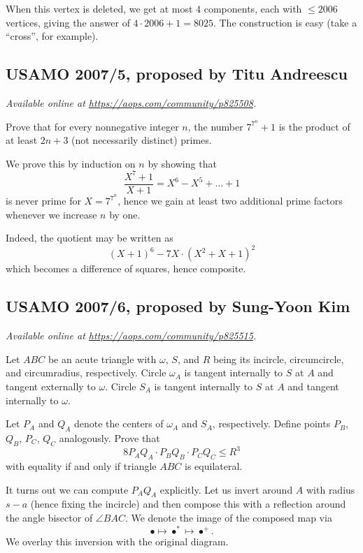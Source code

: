 \documentclass[11pt]{scrartcl}
\begin{document}
When this vertex is deleted,
we get at most $4$ components, each with $\le 2006$ vertices,
giving the answer of $4 \cdot 2006 + 1 = 8025$.
The construction is easy (take a ``cross'', for example).
\pagebreak

\subsection{USAMO 2007/5, proposed by Titu Andreescu}
\textsl{Available online at \url{https://aops.com/community/p825508}.}
\begin{mdframed}[style=mdpurplebox,frametitle={Problem statement}]
Prove that for every nonnegative integer $n$,
the number $7^{7^n}+1$ is the product
of at least $2n+3$ (not necessarily distinct) primes.
\end{mdframed}
We prove this by induction on $n$ by showing that
\[ \frac{X^7+1}{X+1} = X^6 - X^5 + \dots + 1 \]
is never prime for $X = 7^{7^n}$,
hence we gain at least two additional prime factors
whenever we increase $n$ by one.

Indeed, the quotient may be written as
\[ \left( X+1 \right)^6 - 7X \cdot (X^2+X+1)^2 \]
which becomes a difference of squares, hence composite.
\pagebreak

\subsection{USAMO 2007/6, proposed by Sung-Yoon Kim}
\textsl{Available online at \url{https://aops.com/community/p825515}.}
\begin{mdframed}[style=mdpurplebox,frametitle={Problem statement}]
Let $ABC$ be an acute triangle
with $\omega$, $S$, and $R$ being its incircle,
circumcircle, and circumradius, respectively.
Circle $\omega_{A}$ is tangent internally to $S$
at $A$ and tangent externally to $\omega$.
Circle $S_{A}$ is tangent internally to $S$
at $A$ and tangent internally to $\omega$.

Let $P_A$ and $Q_A$ denote
the centers of $\omega_A$ and $S_A$, respectively.
Define points $P_B$, $Q_B$, $P_C$, $Q_C$ analogously.
Prove that
\[ 8 P_A Q_A \cdot P_B Q_B \cdot P_C Q_C \le R^3 \]
with equality if and only if triangle $ABC$ is equilateral.
\end{mdframed}
It turns out we can compute $P_AQ_A$ explicitly.
Let us invert around $A$ with radius $s-a$
(hence fixing the incircle) and then compose this
with a reflection around the angle bisector of $\angle BAC$.
We denote the image of the composed map via
\[ \bullet \mapsto \bullet^\ast \mapsto \bullet^+. \]
We overlay this inversion with the original diagram.
\end{document}

